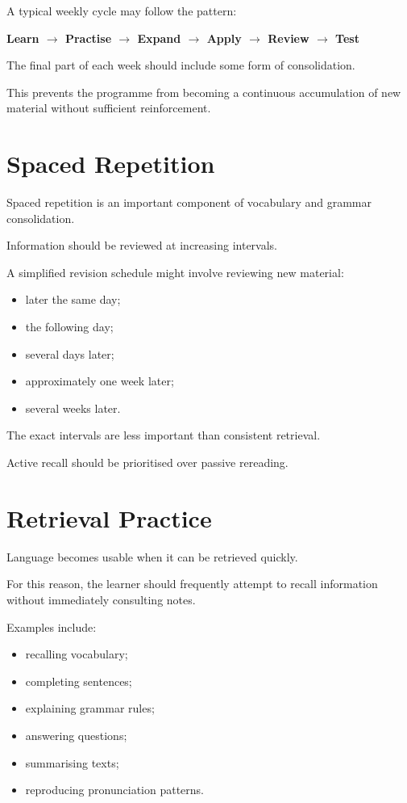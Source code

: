 A typical weekly cycle may follow the pattern:

\begin{center}
\textbf{Learn $\rightarrow$ Practise $\rightarrow$ Expand $\rightarrow$ Apply $\rightarrow$ Review $\rightarrow$ Test}
\end{center}

The final part of each week should include some form of consolidation.

This prevents the programme from becoming a continuous accumulation of new material without sufficient reinforcement.

\section*{Spaced Repetition}

Spaced repetition is an important component of vocabulary and grammar consolidation.

Information should be reviewed at increasing intervals.

A simplified revision schedule might involve reviewing new material:

\begin{itemize}
    \item later the same day;
    \item the following day;
    \item several days later;
    \item approximately one week later;
    \item several weeks later.
\end{itemize}

The exact intervals are less important than consistent retrieval.

Active recall should be prioritised over passive rereading.

\section*{Retrieval Practice}

Language becomes usable when it can be retrieved quickly.

For this reason, the learner should frequently attempt to recall information without immediately consulting notes.

Examples include:

\begin{itemize}
    \item recalling vocabulary;
    \item completing sentences;
    \item explaining grammar rules;
    \item answering questions;
    \item summarising texts;
    \item reproducing pronunciation patterns.
\end{itemize}

